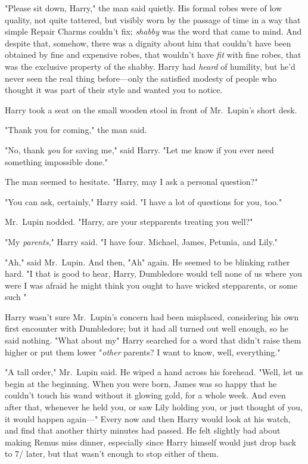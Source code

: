 "Please sit down, Harry," the man said quietly. His formal robes were of low
quality, not quite tattered, but visibly worn by the passage of time in a way
that simple Repair Charms couldn't fix; \emph{shabby} was the word that came to
mind. And despite that, somehow, there was a dignity about him that couldn't
have been obtained by fine and expensive robes, that wouldn't have \emph{fit}
with fine robes, that was the exclusive property of the shabby. Harry had
\emph{heard} of humility, but he'd never seen the real thing before---only the
satisfied modesty of people who thought it was part of their style and wanted
you to notice.

Harry took a seat on the small wooden stool in front of Mr.~Lupin's short desk.

"Thank you for coming," the man said.

"No, thank \emph{you} for saving me," said Harry. "Let me know if you ever need
something impossible done."

The man seemed to hesitate. "Harry, may I{\el} ask a personal question?"

"You can ask, certainly," Harry said. "I have a lot of questions for you, too."

Mr.~Lupin nodded. "Harry, are your stepparents treating you well?"

"My \emph{parents}," Harry said. "I have four. Michael, James, Petunia, and
Lily."

"Ah," said Mr.~Lupin. And then, "Ah" again. He seemed to be blinking rather
hard. "I{\el} that is good to hear, Harry, Dumbledore would tell none of us
where you were{\el} I was afraid he might think you ought to have wicked
stepparents, or some such{\el} "

Harry wasn't sure Mr.~Lupin's concern had been misplaced, considering his own
first encounter with Dumbledore; but it had all turned out well enough, so he
said nothing. "What about my{\el}" Harry searched for a word that didn't
raise them higher or put them lower{\el} "\emph{other} parents? I want to
know, well, everything."

"A tall order," Mr.~Lupin said. He wiped a hand across his forehead. "Well, let
us begin at the beginning. When you were born, James was so happy that he
couldn't touch his wand without it glowing gold, for a whole week. And even
after that, whenever he held you, or saw Lily holding you, or just thought of
you, it would happen again---"
\sbreak
Every now and then Harry would look at his watch, and find that another thirty
minutes had passed. He felt slightly bad about making Remus miss dinner,
especially since Harry himself would just drop back to 7\PM/ later, but that
wasn't enough to stop either of them.

